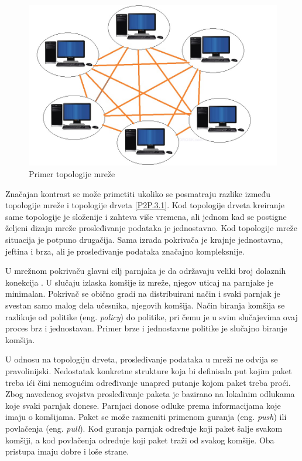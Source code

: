 \documentclass[12pt,oneside]{memoir}
\begin{document}
\begin{figure}[!ht]
  \centering
  \includegraphics[width=1.05\textwidth]{slike/mesh-topology.jpg}
  \caption{Primer topologije mreže}
  \label{fig:topologija-mreze}
\end{figure}
\par

Značajan kontrast se može primetiti ukoliko se posmatraju razlike između topologije mreže i topologije drveta \ref{P2P.3.1}. Kod topologije drveta kreiranje same topologije je složenije i zahteva više vremena, ali jednom kad se postigne željeni dizajn mreže prosleđivanje podataka je jednostavno. Kod topologije mreže situacija je potpuno drugačija. Sama izrada pokrivača je krajnje jednostavna, jeftina i brza, ali je prosleđivanje podataka značajno kompleksnije. 

U mrežnom pokrivaču glavni cilj parnjaka je da održavaju veliki broj dolaznih konekcija \cite{Shen:2009}. U slučaju izlaska komšije iz mreže, njegov uticaj na parnjake je minimalan. Pokrivač se obično gradi na distribuirani način i svaki parnjak je svestan samo malog dela učesnika, njegovih komšija. Način biranja komšija se razlikuje od politike (eng. \textit{policy}) do politike,
pri čemu je u svim slučajevima ovaj proces brz i jednostavan. Primer brze i jednostavne politike je slučajno biranje komšija. 

U odnosu na topologiju drveta, prosleđivanje podataka u mreži ne odvija se pravolinijski. Nedostatak konkretne strukture koja bi definisala put kojim paket treba ići čini nemogućim određivanje unapred putanje kojom paket treba proći. Zbog navedenog svojstva prosleđivanje paketa je bazirano na lokalnim odlukama koje svaki parnjak donese. Parnjaci donose odluke prema informacijama koje imaju o komšijama. Paket se može razmeniti primenom guranja (eng. \textit{push}) ili povlačenja (eng. \textit{pull}). Kod guranja parnjak određuje koji paket šalje svakom komšiji, a kod povlačenja određuje koji paket traži od svakog komšije. Oba pristupa imaju dobre i loše strane. 
\end{document}
